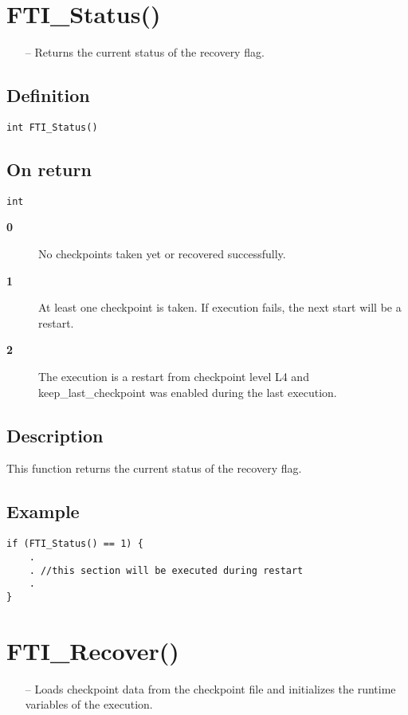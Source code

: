 \documentclass{refrep}
\begin{document}
\section{\asciifamily FTI\_Status()}\label{sec:ftistatus}
\begin{framed}
\begin{itemize}
\item[--] Returns the current status of the recovery flag.
\end{itemize}
\end{framed}
\subsection*{Definition}
\begin{lstlisting}[frame=single]
int FTI_Status()
\end{lstlisting}
\subsection*{On return}
\begin{lstlisting}[frame=single]
int
\end{lstlisting}
\begin{description}
\item[\textbf{0}] No checkpoints taken yet or recovered successfully.
\item[\textbf{1}] At least one checkpoint is taken. If execution fails, the next start will be a restart.
\item[\textbf{2}] The execution is a restart from checkpoint level L4 and keep\_last\_checkpoint was enabled during the last execution.
\end{description}
\subsection*{Description}
This function returns the current status of the recovery flag.
\subsection*{Example}
\begin{center}
\begin{lstlisting}[frame=single]
if (FTI_Status() == 1) {
    .
    . //this section will be executed during restart
    .
}
\end{lstlisting}
\end{center}
\newpage
\section{\asciifamily FTI\_Recover()}\label{sec:ftirecover}
\begin{framed}
\begin{itemize}
\item[--] Loads checkpoint data from the checkpoint file and initializes the runtime variables of the execution.
\end{itemize}
\end{framed}
\end{document}
